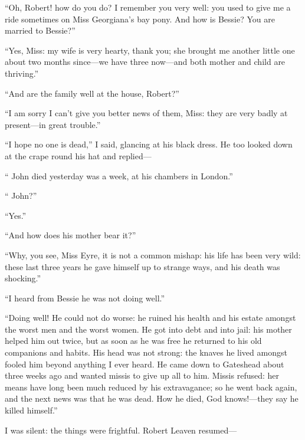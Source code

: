 \enquote{Oh, Robert! how do you do? I remember you very well: you used
to give me a ride sometimes on Miss Georgiana's bay pony. And how is
Bessie? You are married to Bessie?}

\enquote{Yes, Miss: my wife is very hearty, thank you; she brought me
another little one about two months since---we have three now---and both
mother and child are thriving.}

\enquote{And are the family well at the house, Robert?}

\enquote{I am sorry I can't give you better news of them, Miss: they are
very badly at present---in great trouble.}

\enquote{I hope no one is dead,} I said, glancing at his black dress. 
He too looked down at the crape round his hat and replied---

\enquote{\Mr{} John died yesterday was a week, at his chambers in London.}

\enquote{\Mr{} John?}

\enquote{Yes.}

\enquote{And how does his mother bear it?}

\enquote{Why, you see, Miss Eyre, it is not a common mishap: his life
has been very wild: these last three years he gave himself up to strange
ways, and his death was shocking.}

\enquote{I heard from Bessie he was not doing well.}

\enquote{Doing well! He could not do worse: he ruined his health and
his estate amongst the worst men and the worst women. He got into debt
and into jail: his mother helped him out twice, but as soon as he was
free he returned to his old companions and habits. His head was not
strong: the knaves he lived amongst fooled him beyond anything I ever
heard. He came down to Gateshead about three weeks ago and wanted
missis to give up all to him. Missis refused: her means have long been
much reduced by his extravagance; so he went back again, and the next
news was that he was dead. How he died, God knows!---they say he killed
himself.}

I was silent: the things were frightful. Robert Leaven resumed---

